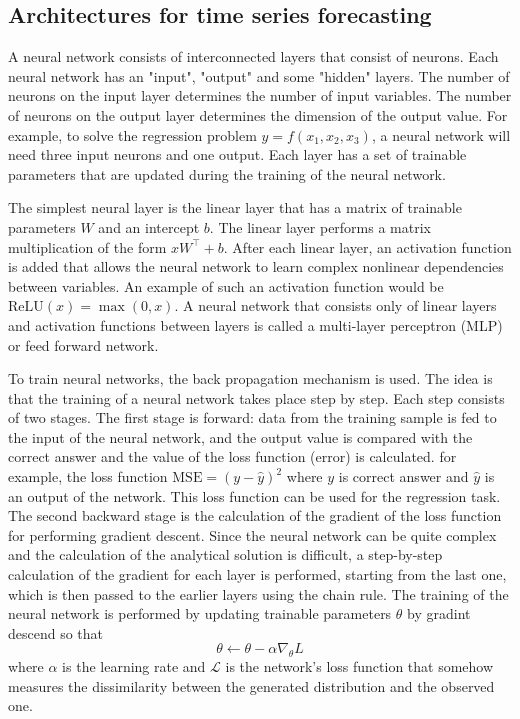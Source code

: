 \documentclass[12pt,a4paper]{article}
\begin{document}
\subsection{Architectures for time series forecasting}

A neural network consists of interconnected layers that consist of neurons. Each neural network has an "input", "output" and some "hidden" layers. The number of neurons on the input layer determines the number of input variables. The number of neurons on the output layer determines the dimension of the output value. For example, to solve the regression problem $y = f (x_1, x_2, x_3)$, a neural network will need three input neurons and one output. Each layer has a set of trainable parameters that are updated during the training of the neural network. 

The simplest neural layer is the linear layer that has a matrix of trainable parameters $W$ and an intercept $b$. The linear layer performs a matrix multiplication of the form $xW^\top + b$. After each linear layer, an activation function is added that allows the neural network to learn complex nonlinear dependencies between variables. An example of such an activation function would be $\text{ReLU} (x) = \max (0, x)$. A neural network that consists only of linear layers and activation functions between layers is called a multi-layer perceptron (MLP) or feed forward network. 

To train neural networks, the back propagation mechanism is used. The idea is that the training of a neural network takes place step by step. Each step consists of two stages. The first stage is forward: data from the training sample is fed to the input of the neural network, and the output value is compared with the correct answer and the value of the loss function (error) is calculated. for example, the loss function $\text{MSE} = (y - \hat y)^2$ where $y$ is correct answer and $\hat y$ is an output of the network. This loss function can be used for the regression task. The second backward stage is the calculation of the gradient of the loss function for performing gradient descent. Since the neural network can be quite complex and the calculation of the analytical solution is difficult, a step-by-step calculation of the gradient for each layer is performed, starting from the last one, which is then passed to the earlier layers using the chain rule. The training of the neural network is performed by updating trainable parameters $\theta$ by gradint descend so that
$$\theta \leftarrow \theta - \alpha \nabla_\theta L$$
where $\alpha$ is the learning rate and $\mathcal L$ is the network's loss function that somehow measures the dissimilarity between the generated distribution and the observed one.
\end{document}
